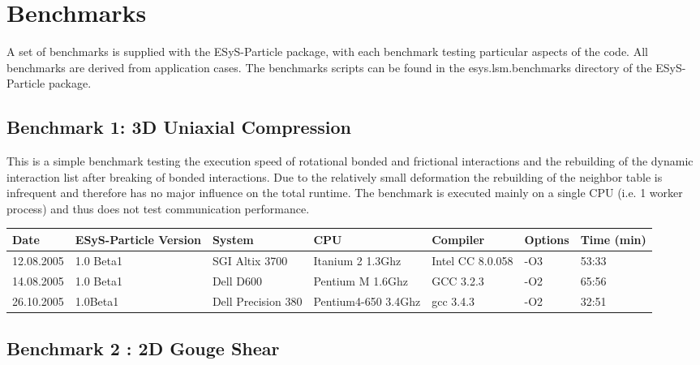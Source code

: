 \documentclass{manual}
\begin{document}
\appendix

\chapter{Benchmarks}

A set of benchmarks is supplied with the ESyS-Particle package, with each benchmark testing particular aspects of the code. All benchmarks are derived from application cases. The benchmarks scripts can be found in the esys.lsm.benchmarks directory of the ESyS-Particle package.

\section{Benchmark 1: 3D Uniaxial Compression}

This is a simple benchmark testing the execution speed of rotational bonded and frictional interactions and the rebuilding of the dynamic interaction list after breaking of bonded interactions. Due to the relatively small deformation the rebuilding of the neighbor table is infrequent and therefore has no major influence on the total runtime. The benchmark is executed mainly on a single CPU (i.e. 1 worker process) and thus does not test communication performance.
 
\begin{tabular}[h]{|l|l|l|l|l|l||l|}
\hline
Date & ESyS-Particle Version & System & CPU & Compiler & Options & Time (min)\\
\hline
\hline
12.08.2005 & 1.0 Beta1 & SGI Altix 3700 & Itanium 2 1.3Ghz & Intel CC 8.0.058 & -O3 & 53:33 \\  
\hline
14.08.2005 & 1.0 Beta1 & Dell D600 & Pentium M 1.6Ghz & GCC 3.2.3 & -O2 & 65:56 \\
 \hline
26.10.2005 & 1.0Beta1 & Dell Precision 380 & Pentium4-650 3.4Ghz & gcc 3.4.3 & -O2 & 32:51 \\
\hline
\end{tabular}

\section{Benchmark 2 : 2D Gouge Shear}
\end{document}
